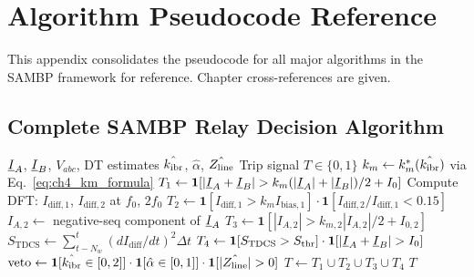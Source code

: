 \chapter{Algorithm Pseudocode Reference}
\label{app:algorithms}

This appendix consolidates the pseudocode for all major algorithms
in the SAMBP framework for reference. Chapter cross-references are given.

\section{Complete SAMBP Relay Decision Algorithm}
\label{app:alg_sambp_relay}

\begin{algorithm}[htbp]
\caption{SAMBP Relay: Complete Decision Logic (50~$\mu$s cycle)}
\label{alg:app_sambp_relay}
\begin{algorithmic}[1]
\Require $\underline{I}_A$, $\underline{I}_B$, $V_{abc}$, DT estimates
         $\hat{k_{\mathrm{ibr}}}$, $\hat{\alpha}$, $\hat{Z_{\mathrm{line}}}$
\Ensure Trip signal $T \in \{0,1\}$
\State {}
\State $k_m \leftarrow k_m^\ast(\hat{k_{\mathrm{ibr}}})$ via Eq.~\eqref{eq:ch4_km_formula}
\State $T_1 \leftarrow \mathbf{1}[|\underline{I}_A + \underline{I}_B| > k_m(|\underline{I}_A|+|\underline{I}_B|)/2 + I_0]$
\State {}
\State Compute DFT: $I_\mathrm{diff,1}$, $I_\mathrm{diff,2}$ at $f_0$, $2f_0$
\State $T_2 \leftarrow \mathbf{1}[I_\mathrm{diff,1} > k_m I_\mathrm{bias,1}] \cdot
         \mathbf{1}[I_\mathrm{diff,2}/I_\mathrm{diff,1} < 0.15]$
\State {}
\State $I_{A,2} \leftarrow$ negative-seq component of $\underline{I}_A$
\State $T_3 \leftarrow \mathbf{1}[|I_{A,2}| > k_{m,2}|I_{A,2}|/2 + I_{0,2}]$
\State {}
\State $S_\mathrm{TDCS} \leftarrow \sum_{t-N_w}^{t}(dI_\mathrm{diff}/dt)^2 \Delta t$
\State $T_4 \leftarrow \mathbf{1}[S_\mathrm{TDCS} > S_\mathrm{thr}] \cdot \mathbf{1}[|\underline{I}_A + \underline{I}_B| > I_0]$
\State {}
\State $\mathrm{veto} \leftarrow \mathbf{1}[\hat{k_{\mathrm{ibr}}} \in [0, 2]] \cdot
         \mathbf{1}[\hat{\alpha} \in [0, 1]] \cdot \mathbf{1}[|\hat{Z_{\mathrm{line}}}| > 0]$
\State {}
\State $T \leftarrow T_1 \cup T_2 \cup T_3 \cup T_4$
\State \Return $T$
\end{algorithmic}
\end{algorithm}


